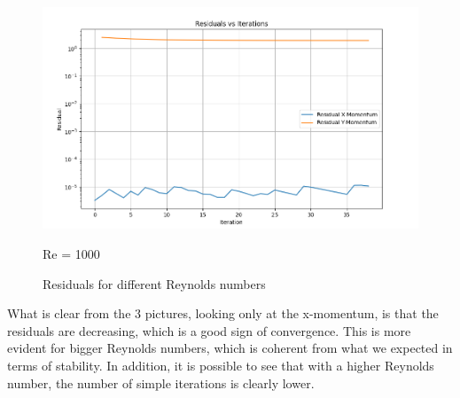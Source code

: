 \documentclass{article}
\begin{document}
\begin{figure}[h!]
\begin{minipage}{0.32\textwidth}
    \includegraphics[width=\textwidth]{Residual Re 1000.png}
    \caption{Re = 1000}
  \end{minipage}
  \caption{Residuals for different Reynolds numbers}
\end{figure}

What is clear from the 3 pictures, looking only at the x-momentum, is that the residuals are decreasing, which is a good sign of convergence. This is more evident for bigger Reynolds numbers, which is coherent from what we expected in terms of stability.
In addition, it is possible to see that with a higher Reynolds number, the number of simple iterations is clearly lower.
\end{document}
